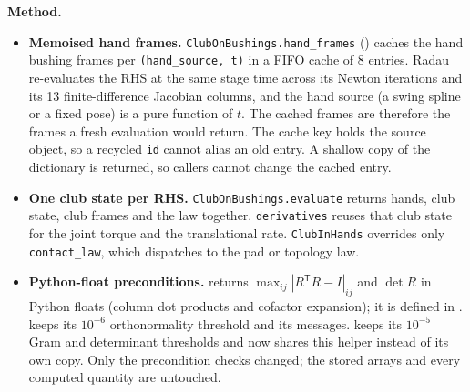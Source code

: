 \documentclass[11pt,a4paper]{article}
\begin{document}
\textbf{Method.}
\begin{itemize}[leftmargin=*,noitemsep]
\item \textbf{Memoised hand frames.} \texttt{ClubOnBushings.hand\_frames}
  () caches the hand bushing frames per
  \texttt{(hand\_source, t)} in a FIFO cache of 8 entries. Radau re-evaluates the RHS at the same stage time across its
  Newton iterations and its 13 finite-difference Jacobian columns, and the hand source (a swing spline or a fixed pose)
  is a pure function of $t$. The cached frames are therefore the frames a fresh evaluation would return. The cache key
  holds the source object, so a recycled \texttt{id} cannot alias an old entry. A shallow copy of the dictionary is
  returned, so callers cannot change the cached entry.
\item \textbf{One club state per RHS.} \texttt{ClubOnBushings.evaluate} returns hands, club state, club frames and the
  law together. \texttt{derivatives} reuses that club state for the joint torque and the translational rate.
  \texttt{ClubInHands} overrides only \texttt{contact\_law}, which dispatches to the pad or topology law.
\item \textbf{Python-float preconditions.}  returns $\max_{ij}|R^{\mathsf T}R - I|_{ij}$ and
  $\det R$ in Python floats (column dot products and cofactor expansion); it is defined in
  .  keeps its
  $10^{-6}$ orthonormality threshold and its messages.  keeps its
  $10^{-5}$ Gram and determinant thresholds and now shares this helper instead of its own copy. Only the precondition
  checks changed; the stored arrays and every computed quantity are untouched.
\end{itemize}
\end{document}
